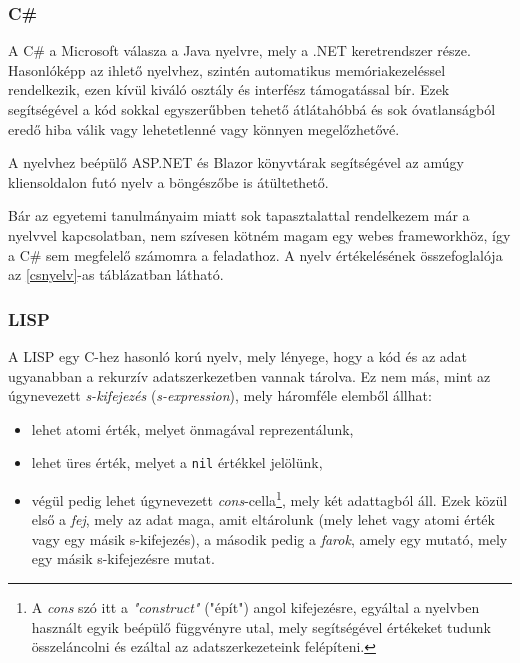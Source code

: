 \subsubsection{C\#}

A C\# a Microsoft válasza a Java nyelvre, mely a .NET keretrendszer része. Hasonlóképp az ihlető nyelvhez, szintén automatikus memóriakezeléssel rendelkezik, ezen kívül kiváló osztály és interfész támogatással bír. Ezek segítségével a kód sokkal egyszerűbben tehető átlátahóbbá és sok óvatlanságból eredő hiba válik vagy lehetetlenné vagy könnyen megelőzhetővé.

A nyelvhez beépülő ASP.NET és Blazor könyvtárak segítségével az amúgy kliensoldalon futó nyelv a böngészőbe is átültethető.

Bár az egyetemi tanulmányaim miatt sok tapasztalattal rendelkezem már a nyelvvel kapcsolatban, nem szívesen kötném magam egy webes frameworkhöz, így a C\# sem megfelelő számomra a feladathoz. A nyelv értékelésének összefoglalója az \ref{csnyelv}-as táblázatban látható.


\subsubsection{LISP}

A LISP\cite{lisp} egy C-hez hasonló korú nyelv, mely lényege, hogy a kód és az adat ugyanabban a rekurzív adatszerkezetben vannak tárolva. Ez nem más, mint az úgynevezett \textit{s-kifejezés} (\textit{s-expression}), mely háromféle elemből állhat: 

\begin{itemize}
  \item lehet atomi érték, melyet önmagával reprezentálunk,
  \item lehet üres érték, melyet a \texttt{nil} értékkel jelölünk,
  \item végül pedig lehet úgynevezett \textit{cons}-cella\footnote{A \textit{cons} szó itt a \textit{"construct"} ("épít") angol kifejezésre, egyáltal a nyelvben használt egyik beépülő függvényre utal, mely segítségével értékeket tudunk összeláncolni és ezáltal az adatszerkezeteink felépíteni.\cite{cons}}, mely két adattagból áll. Ezek közül első a \textit{fej}, mely az adat maga, amit eltárolunk (mely lehet vagy atomi érték vagy egy másik s-kifejezés), a második pedig a \textit{farok}, amely egy mutató, mely egy másik s-kifejezésre mutat.
\end{itemize}

